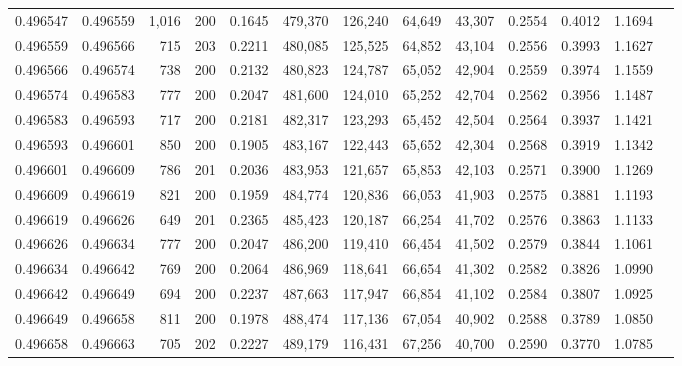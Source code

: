 \begin{tabular}{rrrrrrrrrrrrr}
0.496547 & 0.496559 & 1,016 & 200 &                                     0.1645 & 479,370 & 126,240 &  64,649 &  43,307 & 0.2554 & 0.4012 & 1.1694 \\
0.496559 & 0.496566 &   715 & 203 &                                     0.2211 & 480,085 & 125,525 &  64,852 &  43,104 & 0.2556 & 0.3993 & 1.1627 \\
0.496566 & 0.496574 &   738 & 200 &                                     0.2132 & 480,823 & 124,787 &  65,052 &  42,904 & 0.2559 & 0.3974 & 1.1559 \\
0.496574 & 0.496583 &   777 & 200 &                                     0.2047 & 481,600 & 124,010 &  65,252 &  42,704 & 0.2562 & 0.3956 & 1.1487 \\
0.496583 & 0.496593 &   717 & 200 &                                     0.2181 & 482,317 & 123,293 &  65,452 &  42,504 & 0.2564 & 0.3937 & 1.1421 \\
0.496593 & 0.496601 &   850 & 200 &                                     0.1905 & 483,167 & 122,443 &  65,652 &  42,304 & 0.2568 & 0.3919 & 1.1342 \\
0.496601 & 0.496609 &   786 & 201 &                                     0.2036 & 483,953 & 121,657 &  65,853 &  42,103 & 0.2571 & 0.3900 & 1.1269 \\
0.496609 & 0.496619 &   821 & 200 &                                     0.1959 & 484,774 & 120,836 &  66,053 &  41,903 & 0.2575 & 0.3881 & 1.1193 \\
0.496619 & 0.496626 &   649 & 201 &                                     0.2365 & 485,423 & 120,187 &  66,254 &  41,702 & 0.2576 & 0.3863 & 1.1133 \\
0.496626 & 0.496634 &   777 & 200 &                                     0.2047 & 486,200 & 119,410 &  66,454 &  41,502 & 0.2579 & 0.3844 & 1.1061 \\
0.496634 & 0.496642 &   769 & 200 &                                     0.2064 & 486,969 & 118,641 &  66,654 &  41,302 & 0.2582 & 0.3826 & 1.0990 \\
0.496642 & 0.496649 &   694 & 200 &                                     0.2237 & 487,663 & 117,947 &  66,854 &  41,102 & 0.2584 & 0.3807 & 1.0925 \\
0.496649 & 0.496658 &   811 & 200 &                                     0.1978 & 488,474 & 117,136 &  67,054 &  40,902 & 0.2588 & 0.3789 & 1.0850 \\
0.496658 & 0.496663 &   705 & 202 &                                     0.2227 & 489,179 & 116,431 &  67,256 &  40,700 & 0.2590 & 0.3770 & 1.0785 \\

\end{tabular}
